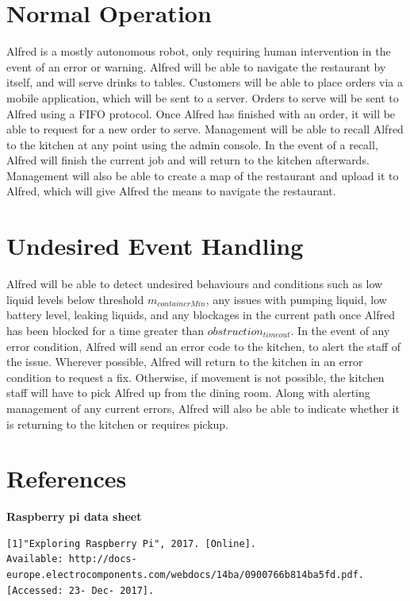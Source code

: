 \documentclass [10pt]{article}
\begin{document}
\section{Normal Operation}
Alfred is a mostly autonomous robot, only requiring human intervention in the event of an error or warning. Alfred will be able to navigate the restaurant by itself, and will serve drinks to tables. Customers will be able to place orders via a mobile application, which will be sent to a server. Orders to serve will be sent to Alfred using a FIFO protocol. Once Alfred has finished with an order, it will be able to request for a new order to serve. Management will be able to recall Alfred to the kitchen at any point using the admin console. In the event of a recall, Alfred will finish the current job and will return to the kitchen afterwards. Management will also be able to create a map of the restaurant and upload it to Alfred, which will give Alfred the means to navigate the restaurant.



\section{Undesired Event Handling}
Alfred will be able to detect undesired behaviours and conditions such as low liquid levels below threshold $ m_{containerMin} $, any issues with pumping liquid, low battery level, leaking liquids, and any blockages in the current path once Alfred has been blocked for a time greater than $ obstruction_{timeout} $. In the event of any error condition, Alfred will send an error code to the kitchen, to alert the staff of the issue. Wherever possible, Alfred will return to the kitchen in an error condition to request a fix. Otherwise, if movement is not possible, the kitchen staff will have to pick Alfred up from the dining room. Along with alerting management of any current errors, Alfred will also be able to indicate whether it is returning to the kitchen or requires pickup.


\section{References}


\textbf{Raspberry pi data sheet}
\begin{verbatim}
[1]"Exploring Raspberry Pi", 2017. [Online]. 
Available: http://docs-europe.electrocomponents.com/webdocs/14ba/0900766b814ba5fd.pdf. 
[Accessed: 23- Dec- 2017].
\end{verbatim}
\end{document}
